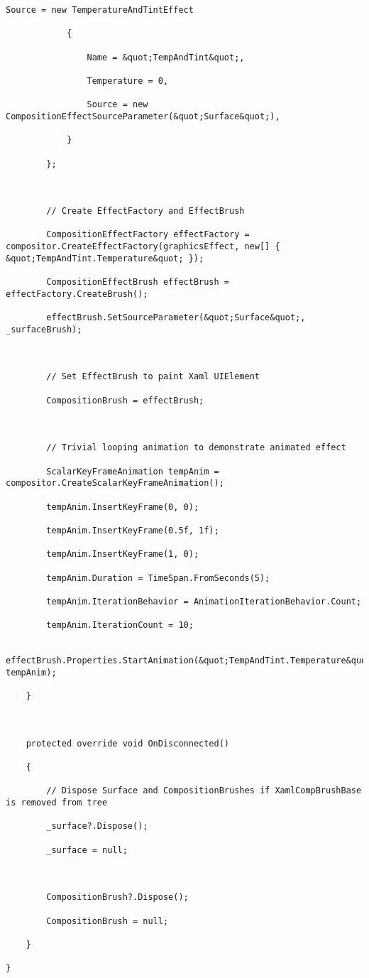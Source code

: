 \begin{lstlisting}[style=CSharpStyle]
			Source = new TemperatureAndTintEffect
			
			{
				
				Name = &quot;TempAndTint&quot;,
				
				Temperature = 0,
				
				Source = new CompositionEffectSourceParameter(&quot;Surface&quot;),
				
			}
			
		};
		
		
		
		// Create EffectFactory and EffectBrush 
		
		CompositionEffectFactory effectFactory = compositor.CreateEffectFactory(graphicsEffect, new[] { &quot;TempAndTint.Temperature&quot; });
		
		CompositionEffectBrush effectBrush = effectFactory.CreateBrush();
		
		effectBrush.SetSourceParameter(&quot;Surface&quot;, _surfaceBrush);
		
		
		
		// Set EffectBrush to paint Xaml UIElement
		
		CompositionBrush = effectBrush;
		
		
		
		// Trivial looping animation to demonstrate animated effect
		
		ScalarKeyFrameAnimation tempAnim = compositor.CreateScalarKeyFrameAnimation();
		
		tempAnim.InsertKeyFrame(0, 0);
		
		tempAnim.InsertKeyFrame(0.5f, 1f);
		
		tempAnim.InsertKeyFrame(1, 0);
		
		tempAnim.Duration = TimeSpan.FromSeconds(5);
		
		tempAnim.IterationBehavior = AnimationIterationBehavior.Count;
		
		tempAnim.IterationCount = 10;
		
		effectBrush.Properties.StartAnimation(&quot;TempAndTint.Temperature&quot;, tempAnim);
		
	}
	
	
	
	protected override void OnDisconnected()
	
	{
		
		// Dispose Surface and CompositionBrushes if XamlCompBrushBase is removed from tree
		
		_surface?.Dispose();
		
		_surface = null;
		
		
		
		CompositionBrush?.Dispose();
		
		CompositionBrush = null;
		
	}
	
}
\end{lstlisting}



